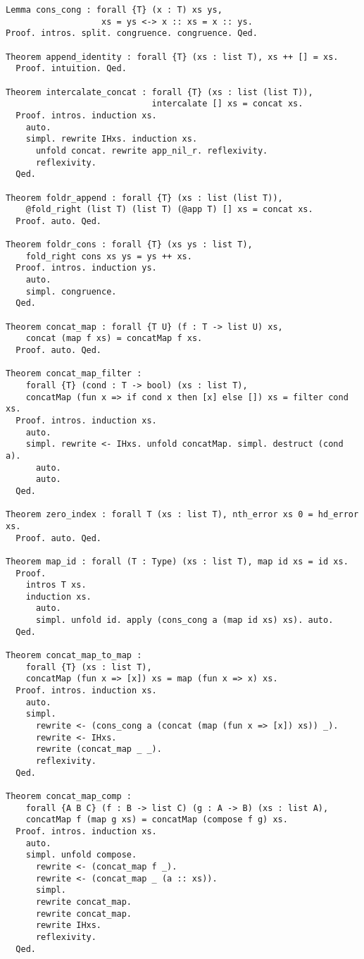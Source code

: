 \begin{verbatim}
Lemma cons_cong : forall {T} (x : T) xs ys,
                   xs = ys <-> x :: xs = x :: ys.
Proof. intros. split. congruence. congruence. Qed.

Theorem append_identity : forall {T} (xs : list T), xs ++ [] = xs.
  Proof. intuition. Qed.

Theorem intercalate_concat : forall {T} (xs : list (list T)),
                             intercalate [] xs = concat xs.
  Proof. intros. induction xs.
    auto.
    simpl. rewrite IHxs. induction xs.
      unfold concat. rewrite app_nil_r. reflexivity.
      reflexivity.
  Qed.

Theorem foldr_append : forall {T} (xs : list (list T)),
    @fold_right (list T) (list T) (@app T) [] xs = concat xs.
  Proof. auto. Qed.

Theorem foldr_cons : forall {T} (xs ys : list T),
    fold_right cons xs ys = ys ++ xs.
  Proof. intros. induction ys.
    auto.
    simpl. congruence.
  Qed.

Theorem concat_map : forall {T U} (f : T -> list U) xs,
    concat (map f xs) = concatMap f xs.
  Proof. auto. Qed.

Theorem concat_map_filter :
    forall {T} (cond : T -> bool) (xs : list T),
    concatMap (fun x => if cond x then [x] else []) xs = filter cond xs.
  Proof. intros. induction xs.
    auto.
    simpl. rewrite <- IHxs. unfold concatMap. simpl. destruct (cond a).
      auto.
      auto.
  Qed.

Theorem zero_index : forall T (xs : list T), nth_error xs 0 = hd_error xs.
  Proof. auto. Qed.

Theorem map_id : forall (T : Type) (xs : list T), map id xs = id xs.
  Proof.
    intros T xs.
    induction xs.
      auto.
      simpl. unfold id. apply (cons_cong a (map id xs) xs). auto.
  Qed.

Theorem concat_map_to_map :
    forall {T} (xs : list T),
    concatMap (fun x => [x]) xs = map (fun x => x) xs.
  Proof. intros. induction xs.
    auto.
    simpl.
      rewrite <- (cons_cong a (concat (map (fun x => [x]) xs)) _).
      rewrite <- IHxs.
      rewrite (concat_map _ _).
      reflexivity.
  Qed.

Theorem concat_map_comp :
    forall {A B C} (f : B -> list C) (g : A -> B) (xs : list A),
    concatMap f (map g xs) = concatMap (compose f g) xs.
  Proof. intros. induction xs.
    auto.
    simpl. unfold compose.
      rewrite <- (concat_map f _).
      rewrite <- (concat_map _ (a :: xs)).
      simpl.
      rewrite concat_map.
      rewrite concat_map.
      rewrite IHxs.
      reflexivity.
  Qed.


\end{verbatim}
